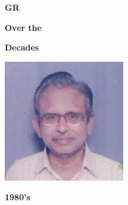 \begin{minipage}{4cm}
\centerline{{\huge\sf\bf GR}}
\smallskip

\centerline{{\huge\sf\bf Over the}}
\smallskip

\centerline{{\huge\sf\bf Decades}}
\vskip 1cm

\centerline{\includegraphics[scale=0.68]{src/images/1980s.jpg}}
\centerline{\bf 1980's}
\end{minipage}

